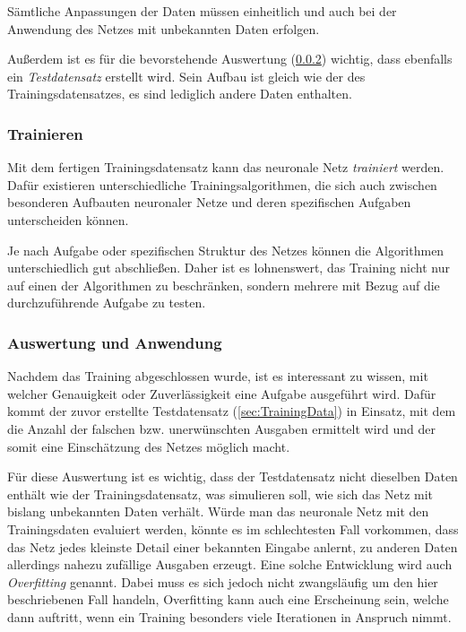 \documentclass[12pt,a4]{article}
\begin{document}
Sämtliche Anpassungen der Daten müssen einheitlich und auch bei der Anwendung des Netzes mit unbekannten Daten erfolgen.

Außerdem ist es für die bevorstehende Auswertung (\ref{sec:Evaluation}) wichtig, dass ebenfalls ein \textit{Testdatensatz} erstellt wird. Sein Aufbau ist gleich wie der des Trainingsdatensatzes, es sind lediglich andere Daten enthalten. 

\subsubsection{Trainieren}\label{sec:Training}
Mit dem fertigen Trainingsdatensatz kann das neuronale Netz \textit{trainiert} werden. Dafür existieren unterschiedliche Trainingsalgorithmen, die sich auch zwischen besonderen Aufbauten neuronaler Netze und deren spezifischen Aufgaben unterscheiden können. 

Je nach Aufgabe oder spezifischen Struktur des Netzes können die Algorithmen unterschiedlich gut abschließen. Daher ist es lohnenswert, das Training nicht nur auf einen der Algorithmen zu beschränken, sondern mehrere mit Bezug auf die durchzuführende Aufgabe zu testen.

\subsubsection{Auswertung und Anwendung}\label{sec:Evaluation}
Nachdem das Training abgeschlossen wurde, ist es interessant zu wissen, mit welcher Genauigkeit oder Zuverlässigkeit eine Aufgabe ausgeführt wird. Dafür kommt der zuvor erstellte Testdatensatz (\ref{sec:TrainingData}) in Einsatz, mit dem die Anzahl der falschen bzw. unerwünschten Ausgaben ermittelt wird und der somit eine Einschätzung des Netzes möglich macht.

Für diese Auswertung ist es wichtig, dass der Testdatensatz nicht dieselben Daten enthält wie der Trainingsdatensatz, was simulieren soll, wie sich das Netz mit bislang unbekannten Daten verhält. Würde man das neuronale Netz mit den Trainingsdaten evaluiert werden, könnte es im schlechtesten Fall vorkommen, dass das Netz jedes kleinste Detail einer bekannten Eingabe anlernt, zu anderen Daten allerdings nahezu zufällige Ausgaben erzeugt. Eine solche Entwicklung wird auch \textit{Overfitting} genannt. Dabei muss es sich jedoch nicht zwangsläufig um den hier beschriebenen Fall handeln, Overfitting kann auch eine Erscheinung sein, welche dann auftritt, wenn ein Training besonders viele Iterationen in Anspruch nimmt.
\end{document}
